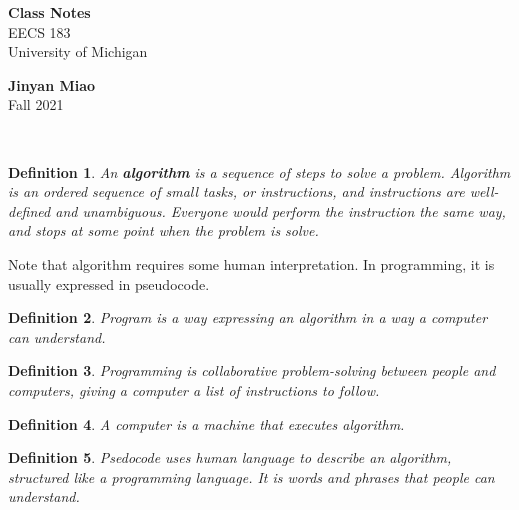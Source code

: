 \documentclass[11pt]{article}
\theoremstyle{break}
\theoremstyle{break}
\newtheorem{defn}{Definition}[corL]
\begin{document}
	\begin{titlepage}
		\begin{center}
			\vspace*{\fill}
			\Huge \color{red}
				\textbf{Class Notes}\\
			\vspace{0.5cm}			
			\Large \color{black}
				EECS 183\\	
				University of Michigan\\
			\vspace{3cm}

			
			\vspace{5cm}
			\LARGE
				\textbf{Jinyan Miao}\\
				Fall 2021\\
			\vspace{5cm}

		\vspace*{\fill}
		\end{center}			
	\end{titlepage}

\newpage
\Large\textbf{}\\

\normalsize 
\begin{defn}
An \textbf{algorithm} is a sequence of steps to solve a problem. Algorithm is an ordered sequence of small tasks, or instructions, and instructions are well-defined and unambiguous. Everyone would perform the instruction the same way, and stops at some point when the problem is solve.
\end{defn}

Note that algorithm requires some human interpretation. In programming, it is usually expressed in pseudocode.

\begin{defn}
Program is a way expressing an algorithm in a way a computer can understand.
\end{defn}

\begin{defn}
Programming is collaborative problem-solving between people and computers, giving a computer a list of instructions to follow.
\end{defn}

\begin{defn}
A computer is a machine that executes algorithm.
\end{defn}

\begin{defn}
Psedocode uses human language to describe an algorithm, structured like a programming language. It is words and phrases that people can understand.
\end{defn}
\end{document}
